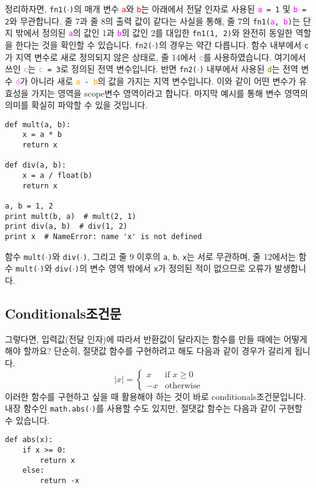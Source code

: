 \documentclass[../main.tex]{subfiles}
\begin{document}
정리하자면, \texttt{fn1($\cdot$)}의 매개 변수 \texttt{\textcolor{red}{a}}와 \texttt{\textcolor{red}{b}}는 아래에서 전달 인자로 사용된 \texttt{\textcolor{magenta}{a} = 1} 및 \texttt{\textcolor{magenta}{b} = 2}와 무관합니다.
줄 7과 줄 8의 출력 값이 같다는 사실을 통해, 줄 7의 \texttt{fn1(\textcolor{magenta}{a}, \textcolor{magenta}{b})}는 단지 밖에서 정의된 \texttt{\textcolor{magenta}{a}}의 값인 1과 \texttt{\textcolor{magenta}{b}}의 값인 2를 대입한 \texttt{fn1(1, 2)}와 완전히 동일한 역할을 한다는 것을 확인할 수 있습니다.
\texttt{fn2($\cdot$)}의 경우는 약간 다릅니다.
함수 내부에서 \texttt{c}가 지역 변수로 새로 정의되지 않은 상태로, 줄 14에서 \texttt{\textcolor{violet}{c}}를 사용하였습니다.
여기에서 쓰인 \texttt{\textcolor{violet}{c}}는 \texttt{\textcolor{violet}{c} = 3}로 정의된 전역 변수입니다.
반면 \texttt{fn2($\cdot$)} 내부에서 사용된 \texttt{\textcolor{olive}{d}}는 전역 변수 \texttt{\textcolor{violet}{d}}가 아니라 새로 \texttt{\textcolor{orange}{a} - \textcolor{orange}{b}}의 값을 가지는 지역 변수입니다.
이와 같이 어떤 변수가 유효성을 가지는 영역을 scope변수 영역이라고 합니다.
마지막 예시를 통해 변수 영역의 의미를 확실히 파악할 수 있을 것입니다.
\begin{verbatim}
def mult(a, b):
	x = a * b
	return x

def div(a, b):
	x = a / float(b)
	return x

a, b = 1, 2
print mult(b, a)  # mult(2, 1)
print div(a, b)  # div(1, 2)
print x  # NameError: name 'x' is not defined
\end{verbatim}
함수 \texttt{mult($\cdot$)}와 \texttt{div($\cdot$)}, 그리고 줄 9 이후의 \texttt{a}, \texttt{b}, \texttt{x}는 서로 무관하며, 줄 12에서는 함수 \texttt{mult($\cdot$)}와 \texttt{div($\cdot$)}의 변수 영역 밖에서 \texttt{x}가 정의된 적이 없으므로 오류가 발생합니다.

\subsection{Conditionals조건문}
그렇다면, 입력값(전달 인자)에 따라서 반환값이 달라지는 함수를 만들 때에는 어떻게 해야 할까요?
단순히, 절댓값 함수를 구현하려고 해도 다음과 같이 경우가 갈리게 됩니다.
$$
|x| = \begin{cases}
x & \text{if $x \geq 0$}\\
-x & \text{otherwise}
\end{cases}
$$
이러한 함수를 구현하고 싶을 때 활용해야 하는 것이 바로 conditionals조건문입니다.
내장 함수인 \texttt{math.abs($\cdot$)}를 사용할 수도 있지만, 절댓값 함수는 다음과 같이 구현할 수 있습니다.
\begin{verbatim}
def abs(x):
	if x >= 0:
		return x
	else:
		return -x
\end{verbatim}
\end{document}
